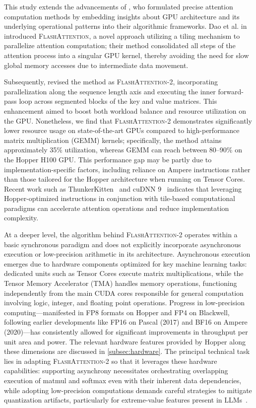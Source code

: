 This study extends the advancements of \citet{dao2022flashattention}, who formulated precise attention computation methods by embedding insights about GPU architecture and its underlying operational patterns into their algorithmic frameworks. Dao et al. in \citep{dao2022flashattention} introduced \textsc{FlashAttention}, a novel approach utilizing a tiling mechanism to parallelize attention computation; their method consolidated all steps of the attention process into a singular GPU kernel, thereby avoiding the need for slow global memory accesses due to intermediate data movement. 

Subsequently, \citet{dao2023flashattention2} revised the method as \textsc{FlashAttention-2}, incorporating parallelization along the sequence length axis and executing the inner forward-pass loop across segmented blocks of the key and value matrices. This enhancement aimed to boost both workload balance and resource utilization on the GPU. Nonetheless, we find that \textsc{FlashAttention-2} demonstrates significantly lower resource usage on state-of-the-art GPUs compared to high-performance matrix multiplication (GEMM) kernels; specifically, the method attains approximately 35\% utilization, whereas GEMM can reach between 80–90\% on the Hopper H100 GPU. This performance gap may be partly due to implementation-specific factors, including reliance on Ampere instructions rather than those tailored for the Hopper architecture when running on Tensor Cores. Recent work such as ThunkerKitten~\citep{spector2024thunder} and cuDNN 9~\citep{cudnn9} indicates that leveraging Hopper-optimized instructions in conjunction with tile-based computational paradigms can accelerate attention operations and reduce implementation complexity.

At a deeper level, the algorithm behind \textsc{FlashAttention-2} operates within a basic synchronous paradigm and does not explicitly incorporate asynchronous execution or low-precision arithmetic in its architecture. Asynchronous execution emerges due to hardware components optimized for key machine learning tasks: dedicated units such as Tensor Cores execute matrix multiplications, while the Tensor Memory Accelerator (TMA) handles memory operations, functioning independently from the main CUDA cores responsible for general computation involving logic, integer, and floating point operations. Progress in low-precision computing—manifested in FP8 formats on Hopper and FP4 on Blackwell, following earlier developments like FP16 on Pascal (2017) and BF16 on Ampere (2020)—has consistently allowed for significant improvements in throughput per unit area and power. The relevant hardware features provided by Hopper along these dimensions are discussed in \cref{subsec:hardware}.  
The principal technical task lies in adapting \textsc{FlashAttention-2} so that it leverages these hardware capabilities: supporting asynchrony necessitates orchestrating overlapping execution of matmul and softmax even with their inherent data dependencies, while adopting low-precision computations demands careful strategies to mitigate quantization artifacts, particularly for extreme-value features present in LLMs~\citep{dettmers2208llm, sun2024massive}.

